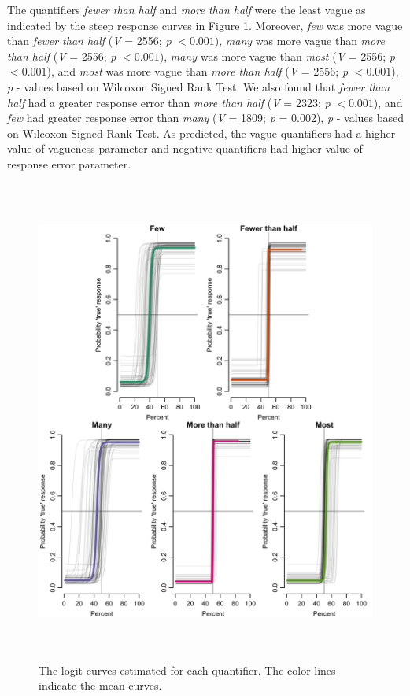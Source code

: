 \documentclass{article}
\begin{document}
The quantifiers \textit{fewer than half} and \textit{more than half} were the least vague as indicated by the steep response curves in Figure \ref{fig:fig2.2}. Moreover, \textit{few} was more vague than \textit{fewer than half} (\textit{V} = 2556; \textit{p} $< 0.001$), \textit{many} was more vague than \textit{more than half} (\textit{V} = 2556; \textit{p} $< 0.001$), \textit{many} was more vague than \textit{most} (\textit{V} = 2556; \textit{p} $< 0.001$), and \textit{most} was more vague than \textit{more than half} (\textit{V} = 2556; \textit{p} $< 0.001$), \textit{p} - values based on Wilcoxon Signed Rank Test. We also found that \textit{fewer than half} had a greater response error than \textit{more than half} (\textit{V} = 2323; \textit{p} $< 0.001$), and \textit{few} had greater response error than \textit{many} (\textit{V} = 1809; \textit{p} = 0.002), \textit{p} - values based on Wilcoxon Signed Rank Test. As predicted, the vague quantifiers had a higher value of vagueness parameter and negative quantifiers had higher value of response error parameter.

\begin{figure} [H]
    \centering
    \includegraphics[width=\textwidth, height=16cm]{Figure2.2.png}
    \caption{The logit curves estimated for each quantifier. The color lines indicate the mean curves.}
    \label{fig:fig2.2}
\end{figure}
\end{document}
